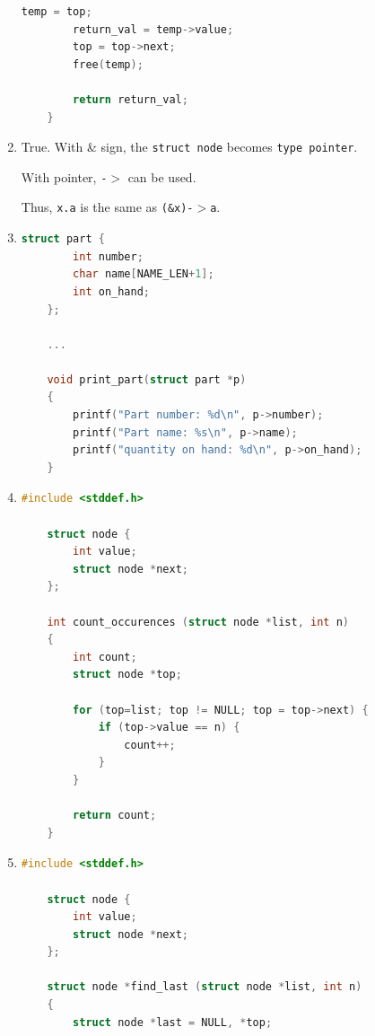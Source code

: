 \documentclass[12pt]{article}
\begin{document}
\begin{enumerate}[1.]
\begin{lstlisting}[language=c]
        temp = top;
        return_val = temp->value;
        top = top->next;
        free(temp);

        return return_val;
    }
\end{lstlisting}

    \item

    True. With \& sign, the \texttt{struct node} becomes \texttt{type pointer}.

    \bigskip

    With pointer, \texttt{-$>$} can be used.

    \bigskip

    Thus, \texttt{x.a} is the same as \texttt{(\&x)-$>$a}.

    \item

\begin{lstlisting}[language=c]
    struct part {
        int number;
        char name[NAME_LEN+1];
        int on_hand;
    };

    ...

    void print_part(struct part *p)
    {
        printf("Part number: %d\n", p->number);
        printf("Part name: %s\n", p->name);
        printf("quantity on hand: %d\n", p->on_hand);
    }
\end{lstlisting}

    \item

\begin{lstlisting}[language=c]
    #include <stddef.h>

    struct node {
        int value;
        struct node *next;
    };

    int count_occurences (struct node *list, int n)
    {
        int count;
        struct node *top;

        for (top=list; top != NULL; top = top->next) {
            if (top->value == n) {
                count++;
            }
        }

        return count;
    }
\end{lstlisting}


    \item

\begin{lstlisting}[language=c]
    #include <stddef.h>

    struct node {
        int value;
        struct node *next;
    };

    struct node *find_last (struct node *list, int n)
    {
        struct node *last = NULL, *top;


\end{lstlisting}
\end{enumerate}
\end{document}
